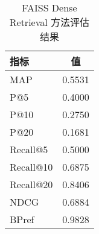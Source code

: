 \begin{table}[h]
\centering
\caption{FAISS Dense Retrieval 方法评估结果}
\begin{tabular}{|l|c|}
\hline
指标 & 值 \\
\hline
MAP & 0.5531 \\
P@5 & 0.4000 \\
P@10 & 0.2750 \\
P@20 & 0.1681 \\
Recall@5 & 0.5000 \\
Recall@10 & 0.6875 \\
Recall@20 & 0.8406 \\
NDCG & 0.6884 \\
BPref & 0.9828 \\
\hline
\end{tabular}
\end{table}
